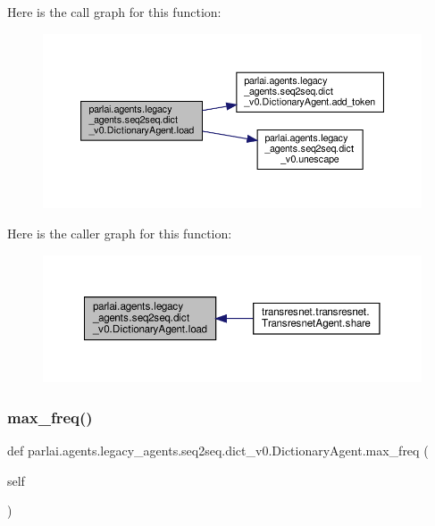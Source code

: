 Here is the call graph for this function\+:
\nopagebreak
\begin{figure}[H]
\begin{center}
\leavevmode
\includegraphics[width=350pt]{classparlai_1_1agents_1_1legacy__agents_1_1seq2seq_1_1dict__v0_1_1DictionaryAgent_a4a13c4937c3cd5bb14d5f28658ece153_cgraph}
\end{center}
\end{figure}
Here is the caller graph for this function\+:
\nopagebreak
\begin{figure}[H]
\begin{center}
\leavevmode
\includegraphics[width=350pt]{classparlai_1_1agents_1_1legacy__agents_1_1seq2seq_1_1dict__v0_1_1DictionaryAgent_a4a13c4937c3cd5bb14d5f28658ece153_icgraph}
\end{center}
\end{figure}
\mbox{\label{classparlai_1_1agents_1_1legacy__agents_1_1seq2seq_1_1dict__v0_1_1DictionaryAgent_a390adb45c505b2b35d3bd3e67aa301ee}} 
\subsubsection{\texorpdfstring{max\+\_\+freq()}{max\_freq()}}
{\footnotesize\ttfamily def parlai.\+agents.\+legacy\+\_\+agents.\+seq2seq.\+dict\+\_\+v0.\+Dictionary\+Agent.\+max\+\_\+freq (\begin{DoxyParamCaption}\item[{}]{self }\end{DoxyParamCaption})}



